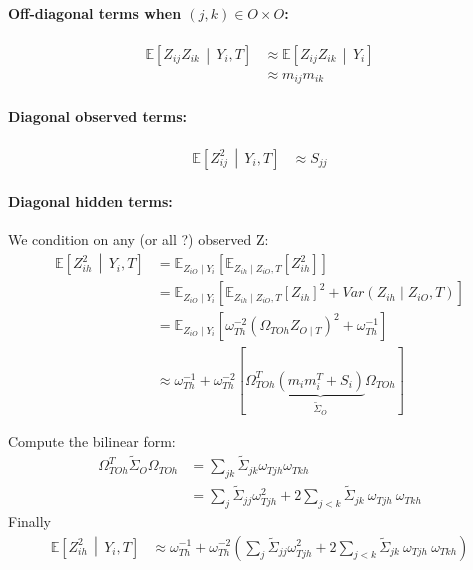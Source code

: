 \documentclass[11pt,a4paper]{article}
\newcommand{\Esp}{\mathds{E}}
\begin{document}
\paragraph{Off-diagonal terms  when $(j,k)\in O\times O$:}
\begin{align*}
\Esp\left[ Z_{ij} Z_{ik} \,\middle\vert\,  Y_i,T \right] & \approx\Esp\left[Z_{ij} Z_{ik}  \,\middle\vert\,  Y_i\right]\\
&\approx  m_{ij}m_{ik}
\end{align*}
\paragraph{Diagonal observed terms:}
\begin{align*}
\Esp\left[ Z_{ij}^2 \,\middle\vert\,  Y_i,T \right] & \approx S_{jj}
\end{align*}
\paragraph{Diagonal hidden terms:\\}
We condition on any (or all ?) observed Z:
 \begin{align*}
\Esp\left[ Z_{ih}^2 \,\middle\vert\,  Y_i,T \right] & = \Esp_{Z_{iO}\mid Y_i}\left[ \Esp_{Z_{ih}\mid  Z_{iO},T}[Z_{ih}^2]\right]\\
&= \Esp_{Z_{iO}\mid Y_i}\left[ \Esp_{Z_{ih}\mid  Z_{iO},T}[Z_{ih}]^2 + Var(Z_{ih} \mid Z_{iO}, T)\right]\\
&= \Esp_{Z_{iO}\mid Y_i}\left[ \omega_{Th}^{-2}(\Omega_{TOh}Z_{O\mid T})^2 + \omega_{Th}^{-1}\right]\\
& \approx \omega_{Th}^{-1}+\omega_{Th}^{-2}[\Omega_{TOh}^T\underbrace{(m_im_i^T+S_i)}_{\tilde{\Sigma}_O}\Omega_{TOh}]
\end{align*}

Compute the bilinear form:
\begin{align*}
\Omega_{TOh}^T \tilde{\Sigma}_O\Omega_{TOh} &= \sum_{jk} \tilde{\Sigma}_{jk} \omega_{Tjh}\omega_{Tkh}\\
&= \sum_j \tilde{\Sigma}_{jj} \omega_{Tjh}^2 +2\sum_{j < k} \tilde{\Sigma}_{jk} \: \omega_{Tjh} \: \omega_{Tkh}
\end{align*}
 Finally 
 \begin{align*}
 \Esp\left[ Z_{ih}^2 \,\middle\vert\,  Y_i,T \right] &\approx \omega_{Th}^{-1}+\omega_{Th}^{-2} \left( \sum_j \tilde{\Sigma}_{jj} \omega_{Tjh}^2 +2\sum_{j < k} \tilde{\Sigma}_{jk} \: \omega_{Tjh} \: \omega_{Tkh}\right)
 \end{align*}
 
\end{document}
